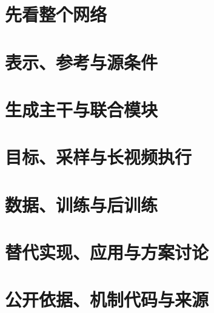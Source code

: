 \part{先看整个网络}

\part{表示、参考与源条件}









\part{生成主干与联合模块}




\part{目标、采样与长视频执行}







\part{数据、训练与后训练}




\part{替代实现、应用与方案讨论}





\part{公开依据、机制代码与来源}



